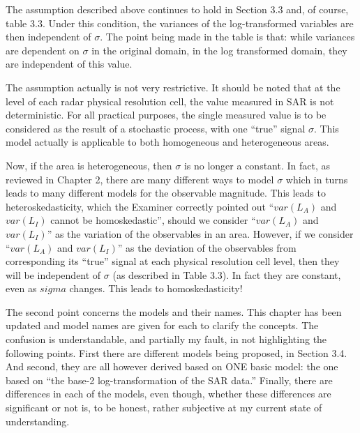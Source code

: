 The assumption described above continues to hold in Section 3.3 and, of course, table 3.3.
Under this condition, the variances of the log-transformed variables are then independent of $\sigma$.
The point being made in the table is that: 
  while variances are dependent on $\sigma$ in the original domain,
  in the log transformed domain, they are independent of this value.

The assumption actually is not very restrictive.
It should be noted that at the level of each radar physical resolution cell, 
  the value measured in SAR is not deterministic.
For all practical purposes, the single measured value is to be considered as the result of a stochastic process, with one ``true'' signal $\sigma$.
This model actually is applicable to both homogeneous and heterogeneous areas.

Now, if the area is heterogeneous, then $\sigma$ is no longer a constant.
In fact, as reviewed in Chapter 2, there are many different ways to model $\sigma$ which in turns leads to many different models for the observable magnitude.
This leads to heteroskedasticity, 
  which the Examiner correctly pointed out ``$var(L_A)$ and $var(L_I)$ cannot be homoskedastic'', 
  should we consider ``$var(L_A)$ and $var(L_I)$'' as the variation of the observables in an area.
However, if we consider ``$var(L_A)$ and $var(L_I)$'' as the deviation of the observables from corresponding its ``true'' signal at each physical resolution cell level, 
  then they will be independent of $\sigma$ (as described in Table 3.3).
In fact they are constant, even as $sigma$ changes.
This leads to homoskedasticity!

The second point concerns the models and their names.
This chapter has been updated and model names are given for each to clarify the concepts.
The confusion is understandable, and partially my fault, in not highlighting the following points.
First there are different models being proposed, in Section 3.4.
And second, they are all however derived based on ONE basic model: the one based on ``the base-2 log-transformation of the SAR data.''
Finally, there are differences in each of the models, even though, whether these differences are significant or not is, to be honest, rather subjective at my current state of understanding.

